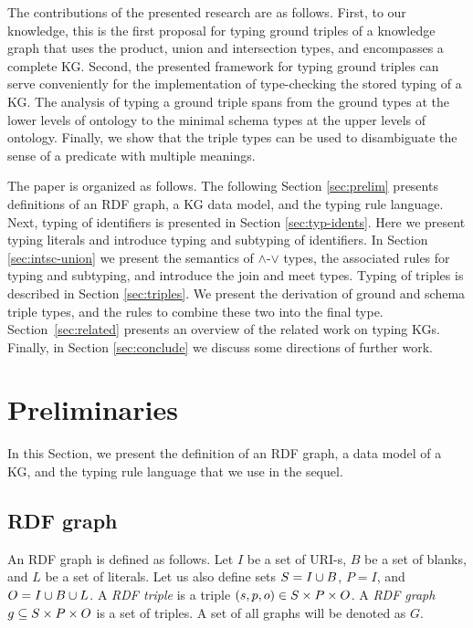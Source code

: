 \documentclass[runningheads]{llncs}
\begin{document}
The contributions of the presented research are as follows. First, to
our knowledge, this is the first proposal for typing ground triples of
a knowledge graph that uses the product, union and intersection types,
and encompasses a complete KG. Second, the presented framework for
typing ground triples can serve conveniently for the implementation of
type-checking the stored typing of a KG. The analysis of typing a
ground triple spans from the ground types at the lower levels of
ontology to the minimal schema types at the upper levels of
ontology. Finally, we show that the triple types can be used to
disambiguate the sense of a predicate with multiple meanings.

The paper is organized as follows. The following Section
\ref{sec:prelim} presents definitions of an RDF graph, a KG data model,
and the typing rule language. Next, typing of identifiers is presented
in Section \ref{sec:typ-idents}. Here we present typing literals and
introduce typing and subtyping of identifiers. In Section
\ref{sec:intsc-union} we present the semantics of $\land$-$\lor$
types, the associated rules for typing and subtyping, and introduce
the join and meet types. Typing of triples is described in Section
\ref{sec:triples}. We present the derivation of ground and schema
triple types, and the rules to combine these two into the final
type. Section~\ref{sec:related} presents an overview of the related
work on typing KGs. Finally, in Section \ref{sec:conclude} we discuss
some directions of further work. 





\section{Preliminaries\label{sec:prelim}}

In this Section, we present the definition of an RDF graph, a data model
of a KG, and the typing rule language that we use in the sequel.



\subsection{RDF graph\label{sec:kg}}

An RDF graph \cite{rdf} is defined as follows. Let $I$ be a set of
URI-s, $B$ be a set of blanks, and $L$ be a set of literals. Let us
also define sets $S = I\cup\/B$, $P = I$, and $O = I\cup\/B\cup\/L$. A
\emph{RDF triple} is a triple $(s,p,o)\in\/S\times\/P\times\/O$. A
\emph{RDF graph} $g\subseteq\/S\times\/P\times\/O$ is a set of
triples. A set of all graphs will be denoted as $G$.
\end{document}
